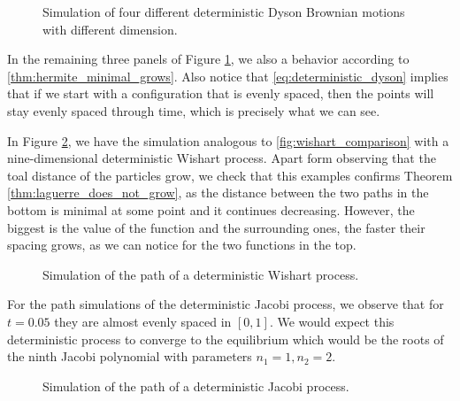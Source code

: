 \begin{figure}[h!]
    
    \caption{Simulation of four different deterministic Dyson Brownian motions with different dimension.\label{fig:four_det_dyson}}
\end{figure}

In the remaining three panels of Figure \ref{fig:four_det_dyson}, we also a behavior according to \ref{thm:hermite_minimal_grows}. Also notice that \eqref{eq:deterministic_dyson} implies that if we start with a configuration that is evenly spaced, then the points will stay evenly spaced through time, which is precisely what we can see. 

In Figure \ref{fig:det_wishart}, we have the simulation analogous to \ref{fig:wishart_comparison} with a nine-dimensional deterministic Wishart process. Apart form observing that the toal distance of the particles grow, we check that this examples confirms Theorem \ref{thm:laguerre_does_not_grow}, as the distance between the two paths in the bottom is minimal at some point and it continues decreasing. However, the biggest is the value of the function and the surrounding ones, the faster their spacing grows, as we can notice for the two functions in the top.

\begin{figure}[h!]
    
    \caption{Simulation of the path of a deterministic Wishart process.\label{fig:det_wishart}}
\end{figure}

For the path simulations of the deterministic Jacobi process, we observe that for $t=0.05$ they are almost evenly spaced in $[0,1]$. We would expect this deterministic process to converge to the equilibrium which would be the roots of the ninth Jacobi polynomial with parameters $n_1 = 1, n_2 =2$. 

\begin{figure}[h!]
    
    \caption{Simulation of the path of a deterministic Jacobi process.\label{fig:det_jacobi}}
\end{figure}

\newpage